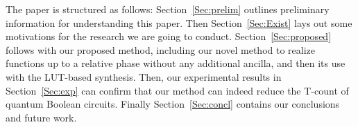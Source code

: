 The paper is structured as follows: Section~\ref{Sec:prelim} outlines preliminary information for understanding this paper. Then Section~\ref{Sec:Exist} lays out some motivations for the research we are going to conduct. Section~\ref{Sec:proposed} follows with our proposed method, including our novel method to realize functions up to a relative phase without any additional ancilla, and then its use with the LUT-based synthesis. Then, our experimental results in Section~\ref{Sec:exp} can confirm that our method can indeed reduce the T-count of quantum Boolean circuits. Finally Section~\ref{Sec:concl} contains our conclusions and future work.

